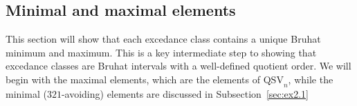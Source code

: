 \documentclass[12pt]{amsart}
\theoremstyle{definition}
\theoremstyle{remark}
\numberwithin{equation}{section}
\newcommand{\QSV}{\mathrm{QSV}}
\begin{document}
\subsection{Minimal and maximal elements}%
\label{sec:minmax}
\label{sec:ex2}

This section will show that each excedance class contains a unique Bruhat minimum and maximum.  
This is a key intermediate step to showing that excedance classes are Bruhat intervals with a well-defined quotient order.  
We will begin with the maximal elements, which are the elements of $\QSV_{n}$, while the minimal ($321$-avoiding) elements are discussed in Subsection~\ref{sec:ex2.1}
\end{document}

